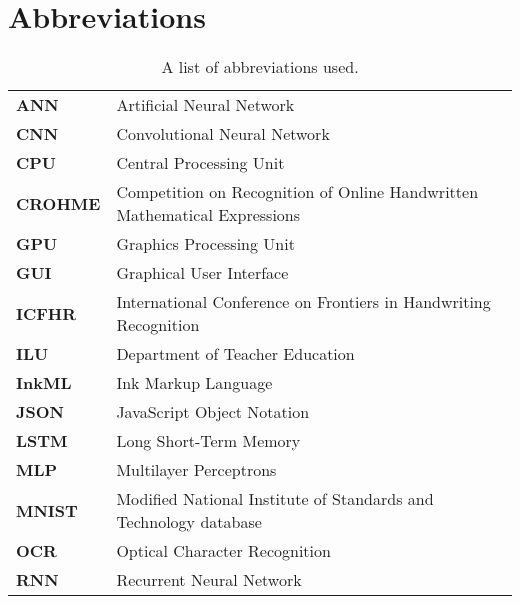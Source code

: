 \section{Abbreviations}  %
\begin{table}[H]
\begin{tabular}{ l l }
\textbf{ANN} & Artificial Neural Network \\
\textbf{CNN} & Convolutional Neural Network \\
\textbf{CPU} & Central Processing Unit \\
\textbf{CROHME} & Competition on Recognition of Online Handwritten Mathematical Expressions\\
\textbf{GPU} & Graphics Processing Unit \\
\textbf{GUI} & Graphical User Interface \\
\textbf{ICFHR} & International Conference on Frontiers in Handwriting Recognition \\
\textbf{ILU} & Department of Teacher Education \\
\textbf{InkML} & Ink Markup Language \\
\textbf{JSON} & JavaScript Object Notation \\
\textbf{LSTM} & Long Short-Term Memory \\
\textbf{MLP} & Multilayer Perceptrons \\
\textbf{MNIST} & Modified National Institute of Standards and Technology database \\
\textbf{OCR} & Optical Character Recognition \\
\textbf{RNN} & Recurrent Neural Network \\
\end{tabular}
\label{table:abbreviations}
\caption{A list of abbreviations used.}
\end{table}
